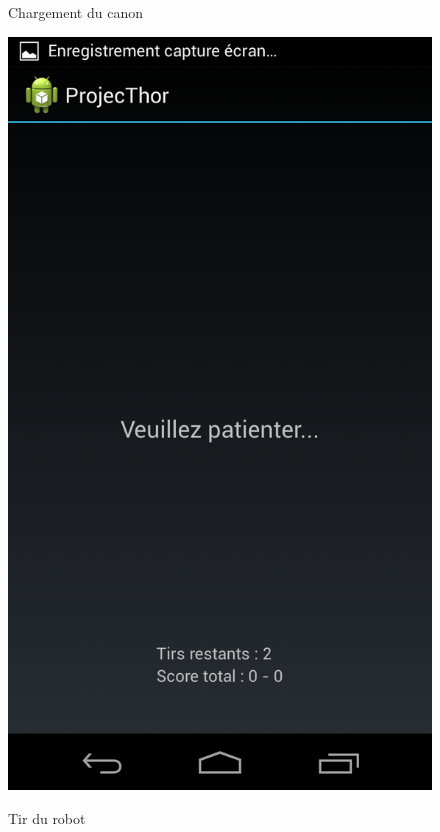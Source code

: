 \begin{figure}

	\begin{minipage}{0.45\textwidth}
		\caption{Chargement du canon}
		\label{view_4}
		\center
		\includegraphics[scale=0.2]{view_4.png}
	\end{minipage}
	\hspace{0.1\textwidth}
	\begin{minipage}{0.45\textwidth}
		\caption{Tir du robot}
		\label{view_5}

\end{minipage}
\end{figure}
